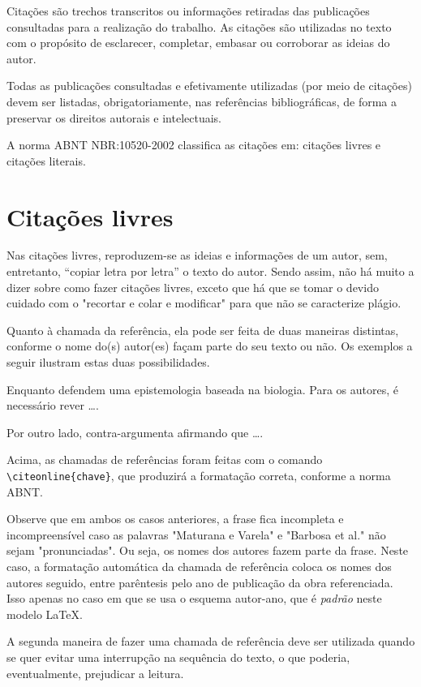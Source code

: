 \begin{apendicesenv}
Citações são trechos transcritos ou informações retiradas das publicações consultadas para a realização do trabalho.
As citações são utilizadas no texto com o propósito de esclarecer, completar, embasar ou corroborar as ideias do autor.

Todas as publicações consultadas e efetivamente utilizadas (por meio de citações) devem ser listadas, obrigatoriamente, nas referências bibliográficas, de forma a preservar os direitos autorais e intelectuais.

A norma ABNT NBR:10520-2002 classifica as citações em: citações livres e citações literais.



\section{Citações livres}
\label{sec:citacoesLivres}


Nas citações livres, reproduzem-se as ideias e informações de um autor, sem, entretanto, ``copiar letra por letra'' o texto do autor. Sendo assim, não há muito a dizer sobre como fazer citações livres, exceto que há que se tomar o devido cuidado com o "recortar e colar e modificar"{} para que não se caracterize plágio.

Quanto à chamada da referência, ela pode ser feita de duas maneiras distintas, conforme o nome do(s) autor(es) façam parte do seu texto ou não. Os exemplos a seguir ilustram estas duas possibilidades.

Enquanto  defendem uma epistemologia baseada na biologia. Para os autores, é necessário rever \ldots.

Por outro lado,  contra-argumenta afirmando que \ldots.

Acima, as chamadas de referências foram feitas com o comando \verb|\citeonline{chave}|, que produzirá a formatação correta, conforme a norma ABNT.

 Observe que em ambos os casos anteriores, a frase fica incompleta e incompreensível caso as palavras "Maturana e Varela"{} e "Barbosa et al."{} não sejam "pronunciadas"{}. Ou seja, os nomes dos autores fazem parte da frase. Neste caso, a formatação automática da chamada de referência coloca os nomes dos autores seguido, entre parêntesis pelo ano de publicação da obra referenciada. Isso apenas no caso em que se usa o esquema autor-ano, que é \textit{padrão} neste modelo \LaTeX{}.

A segunda maneira de fazer uma chamada de referência deve ser utilizada quando se quer evitar uma interrupção na sequência do texto, o que poderia, eventualmente, prejudicar a leitura.


\end{apendicesenv}
